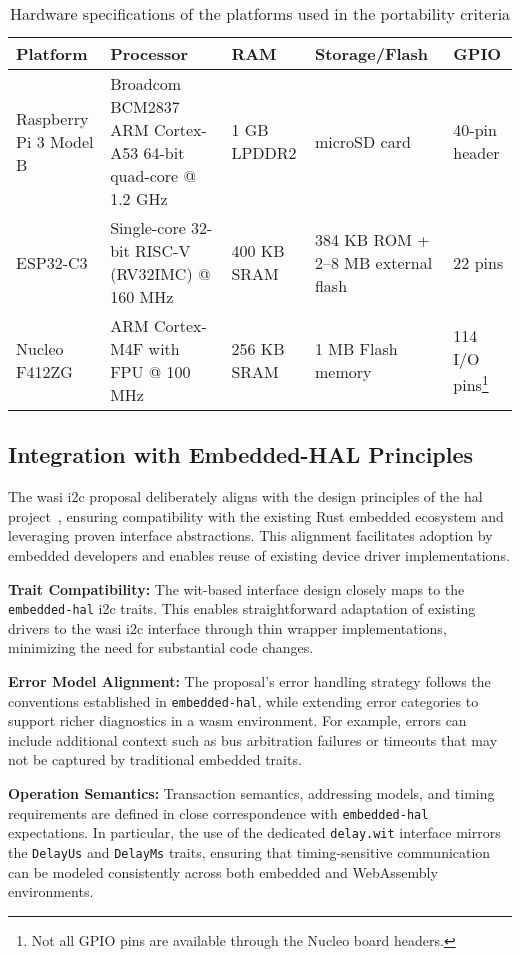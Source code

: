 \begin{table}[H]
    \centering
    \caption{Hardware specifications of the platforms used in the portability criteria}
    \label{tab:portability_criteria_specs}
    \begin{tabular}{lL{4cm}L{2cm}L{3cm}L{1.5cm}}
        \toprule
        \textbf{Platform} & \textbf{Processor} & \textbf{RAM} & \textbf{Storage/Flash} & \textbf{GPIO} \\
        \midrule
        Raspberry Pi 3 Model B & 
        Broadcom BCM2837 ARM Cortex-A53 64-bit quad-core @ 1.2 GHz & 
        1 GB LPDDR2 & 
        microSD card & 
        40-pin header \\
        \hline
        ESP32-C3 & 
        Single-core 32-bit RISC-V (RV32IMC) @ 160 MHz & 
        400 KB SRAM & 
        384 KB ROM + 2--8 MB external flash & 
        22 pins \\
        \hline
        Nucleo F412ZG & 
        ARM Cortex-M4F with FPU @ 100 MHz & 
        256 KB SRAM & 
        1 MB Flash memory & 
        114 I/O pins\footnote{Not all GPIO pins are available through the Nucleo board headers.} \\
        \bottomrule
    \end{tabular}
\end{table}



\subsection{Integration with Embedded-HAL Principles}
\label{subsec:i2c-embedded-hal-integration}

The \acrshort{wasi} \acrshort{i2c} proposal deliberately aligns with the design principles of the \acrshort{hal} project~\cite{hal}, ensuring compatibility with the existing Rust embedded ecosystem and leveraging proven interface abstractions. This alignment facilitates adoption by embedded developers and enables reuse of existing device driver implementations.

\textbf{Trait Compatibility:} The \acrshort{wit}-based interface design closely maps to the \texttt{embedded-hal} \acrshort{i2c} traits. This enables straightforward adaptation of existing drivers to the \acrshort{wasi} \acrshort{i2c} interface through thin wrapper implementations, minimizing the need for substantial code changes.

\textbf{Error Model Alignment:} The proposal’s error handling strategy follows the conventions established in \texttt{embedded-hal}, while extending error categories to support richer diagnostics in a \acrshort{wasm} environment. For example, errors can include additional context such as bus arbitration failures or timeouts that may not be captured by traditional embedded traits.

\textbf{Operation Semantics:} Transaction semantics, addressing models, and timing requirements are defined in close correspondence with \texttt{embedded-hal} expectations. In particular, the use of the dedicated \texttt{delay.wit} interface mirrors the \texttt{DelayUs} and \texttt{DelayMs} traits, ensuring that timing-sensitive communication can be modeled consistently across both embedded and WebAssembly environments.